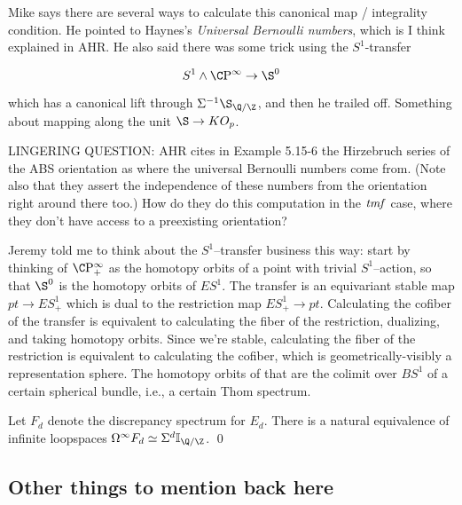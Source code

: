 Mike says there are several ways to calculate this canonical map / integrality condition.  He pointed to Haynes's \textit{Universal Bernoulli numbers}, which is I think explained in AHR.  He also said there was some trick using the $S^1$-transfer

    \[S^1 \sm \CP^\infty \to \S^0\]

which has a canonical lift through $\Susp^{-1} \S_{\Q/\Z}$, and then he trailed off.  Something about mapping along the unit $\S \to KO_p$.

LINGERING QUESTION: AHR cites in Example 5.15-6 the Hirzebruch series of the ABS orientation as where the universal Bernoulli numbers come from. (Note also that they assert the independence of these numbers from the orientation right around there too.) How do they do this computation in the $\mathit{tmf}$ case, where they don't have access to a preexisting orientation?




Jeremy told me to think about the $S^1$--transfer business this way: start by thinking of $\CP^\infty_+$ as the homotopy orbits of a point with trivial $S^1$--action, so that $\S^0$ is the homotopy orbits of $ES^1$.  The transfer is an equivariant stable map $pt \to ES^1_+$ which is dual to the restriction map $ES^1_+ \to pt$.  Calculating the cofiber of the transfer is equivalent to calculating the fiber of the restriction, dualizing, and taking homotopy orbits.  Since we're stable, calculating the fiber of the restriction is equivalent to calculating the cofiber, which is geometrically-visibly a representation sphere.  The homotopy orbits of that are the colimit over $BS^1$ of a certain spherical bundle, i.e., a certain Thom spectrum.





\begin{theorem}
Let $F_d$ denote the discrepancy spectrum for $E_d$.  There is a natural equivalence of infinite loopspaces $\Loops^\infty F_d \simeq \Susp^d \mathbb I_{\Q/\Z}$. \qed
\end{theorem}





\subsection{Other things to mention back here}




